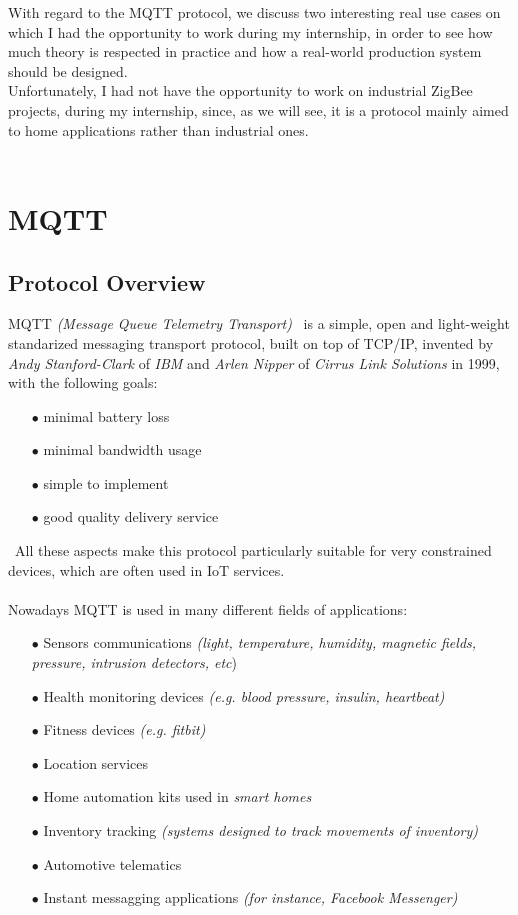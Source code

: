 \documentclass[12pt]{report}
\begin{document}
With regard to the MQTT protocol, we discuss two interesting real use cases on which I had the opportunity to work during my internship, in order to see how much theory is respected in practice and how a real-world production system should be designed.\\

Unfortunately, I had not have the opportunity to work on industrial ZigBee projects, during my internship, since, as we will see, it is a protocol mainly aimed to home applications rather than industrial ones.\\\\

\part{MQTT}

\chapter{Protocol Overview}

\textsc{MQTT} \emph{(Message Queue Telemetry Transport)}~\cite{mqttrfc} is a simple, open and light-weight standarized messaging transport protocol, built on top of TCP/IP, invented by \emph{Andy Stanford-Clark} of \emph{IBM} and \emph{Arlen Nipper} of \emph{Cirrus Link Solutions}\cite{cirruslink} in 1999, with the following goals:

\begin{itemize}
\setlength{\itemindent}{+4mm}
  \item[$\bullet$] minimal battery loss
  \item[$\bullet$] minimal bandwidth usage
  \item[$\bullet$] simple to implement
  \item[$\bullet$] good quality delivery service
\end{itemize}\
All these aspects make this protocol particularly suitable for very constrained devices, which are often used in IoT services.\\\\
Nowadays MQTT is used in many different fields of applications:

 \begin{itemize}
 \setlength{\itemindent}{+4mm}
  \item[$\bullet$] Sensors communications \emph{(light, temperature, humidity, magnetic fields, pressure, intrusion detectors, etc})
  \item[$\bullet$] Health monitoring devices \emph{(e.g. blood pressure, insulin, heartbeat)}
  \item[$\bullet$] Fitness devices\emph{ (e.g. fitbit)}
  \item[$\bullet$] Location services
  \item[$\bullet$] Home automation kits used in \emph{smart homes}
  \item[$\bullet$] Inventory tracking \emph{(systems designed to track movements of inventory)}
  \item[$\bullet$] Automotive telematics
  \item[$\bullet$] Instant messagging applications \emph{(for instance, Facebook Messenger)}
\end{itemize}\
\end{document}

